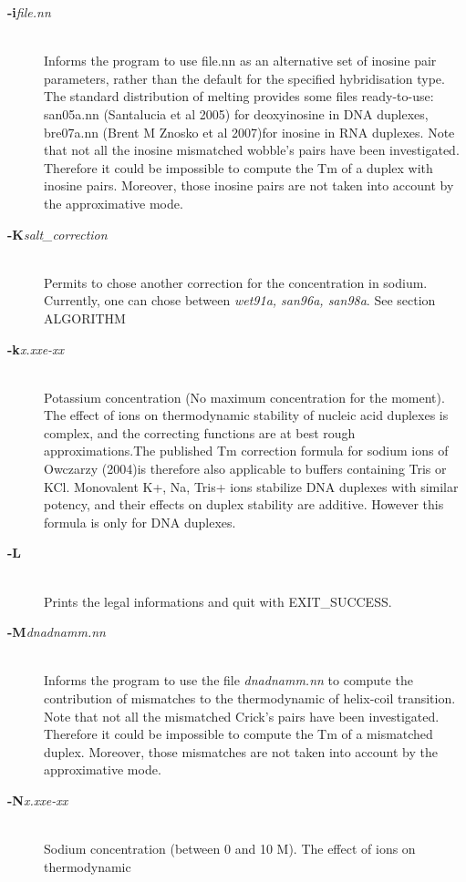 \documentclass{article}
\begin{document}
\begin{description}
\item [\textbf{-i}\textit{file.nn}] \mbox{}\\ 
Informs  the  program to use file.nn as an alternative set  of  inosine pair 
 parameters, rather than  the  default  for the specified hybridisation type. 
 The standard distribution of melting provides some  files ready-to-use:  san05a.nn 
(Santalucia et al 2005) for deoxyinosine in DNA duplexes, bre07a.nn (Brent M Znosko 
 et al 2007)for inosine in RNA duplexes. Note  that  not all the inosine mismatched 
 wobble's pairs have been investigated. Therefore it could be impossible to  compute
 the Tm of a duplex with inosine pairs. Moreover, those inosine pairs are not taken 
 into account by the  approximative mode.
\item [\textbf{-K}\textit{salt\_correction}]\mbox{}\\ 
Permits to chose another correction for the concentration in sodium. Currently, 
one can chose between \textit{wet91a, san96a, san98a}.  See section ALGORITHM 
\item [\textbf{-k}\textit{x.xxe-xx}]\mbox{}\\ 
 Potassium  concentration  (No maximum concentration for the moment). The effect of ions 
 on  thermodynamic  stability  of nucleic  acid duplexes is complex, and the correcting 
 functions are  at  best rough  approximations.The published  Tm  correction formula for 
 sodium ions of Owczarzy (2004)is therefore also applicable to buffers containing Tris or
 KCl. Monovalent K+, Na, Tris+ ions  stabilize  DNA duplexes 
 with similar potency, and their effects on duplex stability are additive. However this formula 
 is only for DNA duplexes.
\item [\textbf{-L}]\mbox{}\\ Prints the legal informations and quit
  with EXIT\_SUCCESS. 
\item [\textbf{-M}\textit{dnadnamm.nn}]\mbox{}\\ 
Informs the program to use the file  \textit{dnadnamm.nn} to compute
the contribution of mismatches to the thermodynamic of helix-coil
transition. Note that not all the mismatched Crick's pairs have been
investigated. Therefore it could be impossible to compute the Tm of a
mismatched duplex. Moreover, those mismatches are not taken into
account by the approximative mode. 
\item [\textbf{-N}\textit{x.xxe-xx}  ]\mbox{}\\
  Sodium concentration (between 0 and 10 M). The effect of ions on thermodynamic

\end{description}
\end{document}
